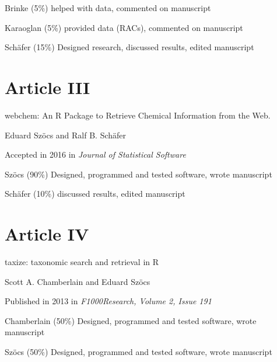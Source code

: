 \begin{sloppypar}
\begin{description}
	Brinke (5\%) helped with data, commented on manuscript

	Karaoglan (5\%) provided data (RACs), commented on manuscript

	Schäfer (15\%) Designed research, discussed results, edited manuscript
\end{description}
\normalsize
\vfill

\section*{Article III}
\vspace{-1em}
\small
\begin{description}
    \setlength\itemsep{0em}
	\item[Title:] webchem: An R Package to Retrieve Chemical Information from the Web.
	\item[Authors:] Eduard Szöcs and Ralf B. Schäfer
	\item[Status:] Accepted in 2016 in \emph{Journal of Statistical Software}
	\item[Contributions:] Szöcs (90\%) Designed, programmed and tested software, wrote manuscript

	Schäfer (10\%) discussed results, edited manuscript
\end{description}
\normalsize
\vfill


\section*{Article IV}
\vspace{-1em}
\small
\begin{description}
    \setlength\itemsep{0em}
	\item[Title:] taxize: taxonomic search and retrieval in R
	\item[Authors:] Scott A. Chamberlain and Eduard Szöcs
	\item[Status:] Published in 2013 in \emph{F1000Research, Volume 2, Issue 191}
	\item[Contributions:] Chamberlain (50\%) Designed, programmed and tested software, wrote manuscript

	Szöcs (50\%) Designed, programmed and tested software, wrote manuscript
\end{description}
\end{sloppypar}


\endgroup
